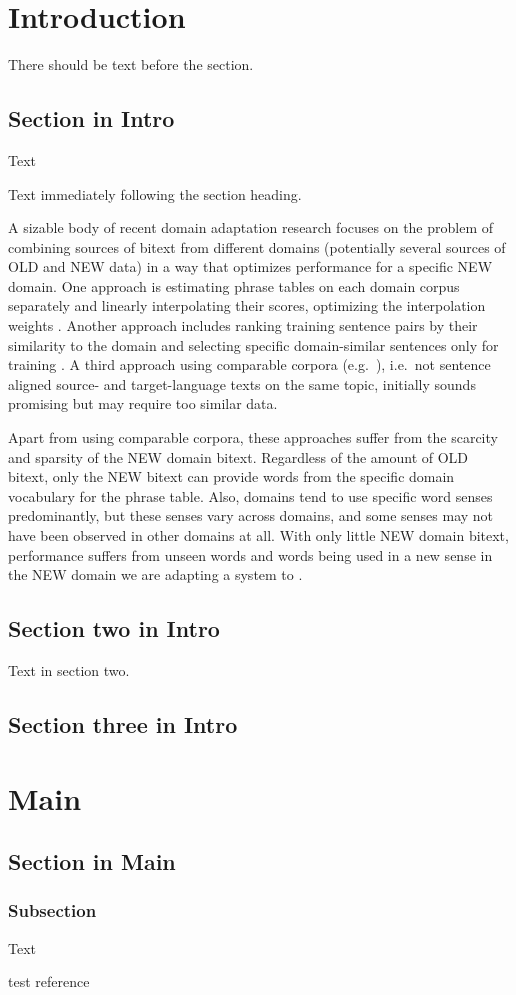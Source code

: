 \documentclass[svgnames]{report}
\newlength\tablength        \setlength\tablength{20pt}
\newlength\ruledepth        \setlength\ruledepth{2pt}
\newlength\rulelength       \setlength\rulelength{0.95\textwidth}
\newlength\tabheight        \setlength\tabheight{0.25in} \addtolength\tabheight{-\ruledepth}
\newlength\raisetitle       \setlength\raisetitle{1ex}
\newlength\insettitle       \setlength\insettitle{1.5em}
\newlength\afterheadingskip \setlength\afterheadingskip{9ex}
\newcommand\problems{%
  \par\noindent
  \begin{tikzpicture} [remember picture,overlay]
      \node[yshift=0.2em-1em-11pt-11pt,xshift=-2cm] at (0,0) %
      {
      \bfseries\Large\sffamily
      \begin{tikzpicture}[remember picture, overlay]
        \fill[fill=LightSkyBlue] (0,0) rectangle
          (\paperwidth,0.2cm);
        \node[anchor=west,yshift=2ex+0.2cm-1.5pt,xshift=2.5pt,rectangle,
              rounded corners=0pt,inner sep=11pt,
              fill=MidnightBlue]
              {\hspace*{-11pt}\hspace*{-3pt}\hspace*{2cm}\color{white} Something in a rect};
       \end{tikzpicture}
      };

  \end{tikzpicture}%
  \\[\afterheadingskip]
}
\begin{document}
\tableofcontents
\chapter{Introduction}
There should be text before the section.

\section{Section in Intro}
Text


Text immediately following the section heading.

A sizable body of recent domain adaptation research focuses on the problem of combining sources of bitext from different domains (potentially several sources of OLD and NEW data) in a way that optimizes performance for a specific NEW domain.
One approach is estimating phrase tables on each domain corpus separately and linearly interpolating their scores, optimizing the interpolation weights \cite{foster2007mixture}. Another approach includes ranking training sentence pairs by their similarity to the domain and selecting specific domain-similar sentences only for training \cite{axelrod2011domain}. A third approach using comparable corpora (e.g.\ \cite{daume2011domain}), i.e.\ not sentence aligned source- and target-language texts on the same topic, initially sounds promising but may require too similar data.

Apart from using comparable corpora, these approaches suffer from the scarcity and sparsity of the NEW domain bitext. Regardless of the amount of OLD bitext, only the NEW bitext can provide words from the specific domain vocabulary for the phrase table. Also, domains tend to use specific word senses predominantly, but these senses vary across domains, and some senses may not have been observed in other domains at all. %
With only little NEW domain bitext, performance suffers from unseen words and words being used in a new sense in the NEW domain we are adapting a system to \cite{irvine2013measuring}. %

\section{Section two in Intro}
Text in section two.

\section{Section three in Intro}


\chapter{Main}
\section{Section in Main}
\subsection{Subsection}
Text
\begin{thebibliography}{99}
 test reference
\end{thebibliography}
\end{document}
